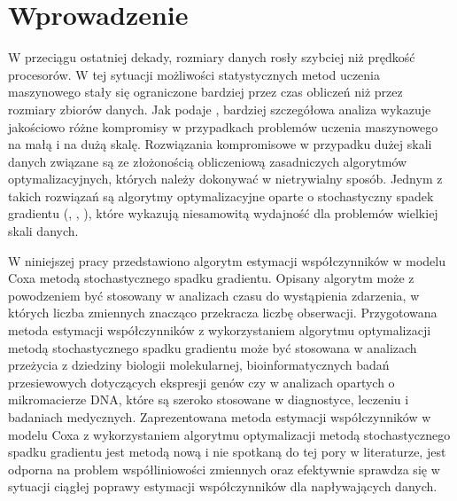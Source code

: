 \chapter*{Wprowadzenie}

W przeciągu ostatniej dekady, rozmiary danych rosły szybciej niż prędkość procesorów. W tej sytuacji możliwości statystycznych metod uczenia maszynowego stały się ograniczone bardziej przez czas obliczeń niż przez rozmiary zbiorów danych. Jak podaje \cite{bott1}, bardziej szczegółowa analiza wykazuje jakościowo różne kompromisy w przypadkach problemów uczenia maszynowego na małą i na dużą skalę. Rozwiązania kompromisowe w przypadku dużej skali danych związane są ze złożonością obliczeniową zasadniczych algorytmów optymalizacyjnych, których należy dokonywać w nietrywialny sposób. Jednym z takich rozwiązań są algorytmy optymalizacyjne oparte o stochastyczny spadek gradientu (\cite{bott1}, \cite{bott2}, \cite{widrow2}), które wykazują niesamowitą wydajność dla problemów wielkiej skali danych.

W niniejszej pracy przedstawiono algorytm estymacji współczynników w modelu Coxa metodą stochastycznego spadku gradientu. Opisany algorytm może z powodzeniem być stosowany w analizach czasu do wystąpienia zdarzenia, w których liczba zmiennych znacząco przekracza liczbę obserwacji. Przygotowana metoda estymacji współczynników z wykorzystaniem algorytmu optymalizacji metodą stochastycznego spadku gradientu może być stosowana w analizach przeżycia z dziedziny biologii molekularnej, bioinformatycznych badań przesiewowych dotyczących ekspresji genów czy w analizach opartych o mikromacierze DNA, które są szeroko stosowane w diagnostyce, leczeniu i badaniach medycznych. Zaprezentowana metoda estymacji współczynników w modelu Coxa z wykorzystaniem algorytmu optymalizacji metodą stochastycznego spadku gradientu jest metodą nową i nie spotkaną do tej pory w literaturze, jest odporna na problem współliniowości zmiennych oraz efektywnie sprawdza się w sytuacji ciągłej poprawy estymacji współczynników dla napływających danych.


